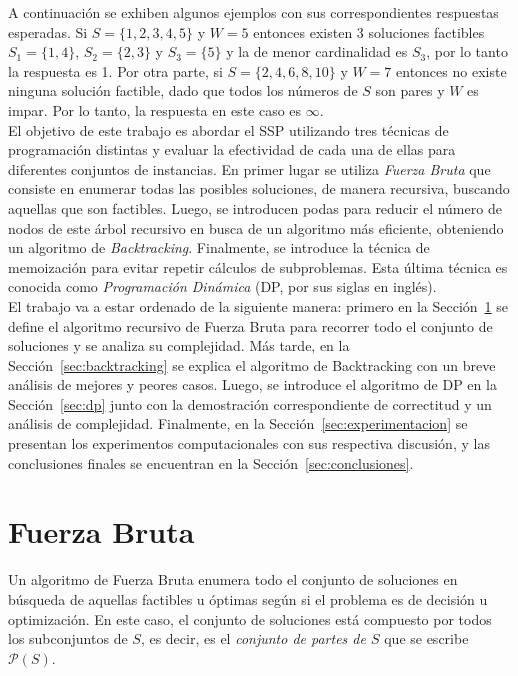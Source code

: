 \documentclass[10pt,a4paper]{article}
\begin{document}
A continuación se exhiben algunos ejemplos con sus correspondientes respuestas esperadas. Si $S = \{ 1, 2, 3, 4, 5 \}$ y $W=5$ entonces existen 3 soluciones factibles $S_1 = \{1, 4\}$, $S_2 = \{2, 3 \}$ y $S_3 = \{5\}$ y la de menor cardinalidad es $S_3$, por lo tanto la respuesta es 1. Por otra parte, si $S = \{ 2, 4, 6, 8, 10 \}$ y $W = 7$ entonces no existe ninguna solución factible, dado que todos los números de $S$ son pares y $W$ es impar. Por lo tanto, la respuesta en este caso es $\infty$.\\

El objetivo de este trabajo es abordar el SSP utilizando tres técnicas de programación distintas y evaluar la efectividad de cada una de ellas para diferentes conjuntos de instancias. En primer lugar se utiliza \emph{Fuerza Bruta} que consiste en enumerar todas las posibles soluciones, de manera recursiva, buscando aquellas que son factibles. Luego, se introducen podas para reducir el número de nodos de este árbol recursivo en busca de un algoritmo más eficiente, obteniendo un algoritmo de \emph{Backtracking}. Finalmente, se introduce la técnica de memoización para evitar repetir cálculos de subproblemas. Esta última técnica es conocida como \emph{Programación Dinámica} (DP, por sus siglas en inglés).\\

El trabajo va a estar ordenado de la siguiente manera: primero en la Sección~\ref{sec:fuerza_bruta} se define el algoritmo recursivo de Fuerza Bruta para recorrer todo el conjunto de soluciones y se analiza su complejidad. Más tarde, en la Sección~\ref{sec:backtracking} se explica el algoritmo de Backtracking con un breve análisis de mejores y peores casos. Luego, se introduce el algoritmo de DP en la Sección~\ref{sec:dp} junto con la demostración correspondiente de correctitud y un análisis de complejidad. Finalmente, en la Sección~\ref{sec:experimentacion} se presentan los experimentos computacionales con sus respectiva discusión, y las conclusiones finales se encuentran en la Sección~\ref{sec:conclusiones}.

\section{Fuerza Bruta} \label{sec:fuerza_bruta}
Un algoritmo de Fuerza Bruta enumera todo el conjunto de soluciones en búsqueda de aquellas factibles u óptimas según si el problema es de decisión u optimización. En este caso, el conjunto de soluciones está compuesto por todos los subconjuntos de $S$, es decir, es el \emph{conjunto de partes de $S$} que se escribe $\mathcal{P}(S)$.
\end{document}
